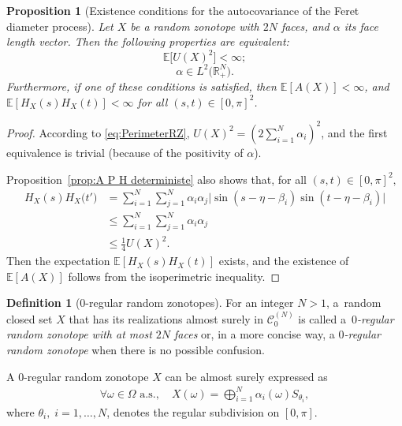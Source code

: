 \documentclass[numbers,compress,v1.0.1]{vmsta}
\newtheorem{proposition}{Proposition}
\theoremstyle{definition}
\newtheorem{definition}{Definition}
\begin{document}
\begin{proposition}[Existence conditions for the autocovariance
of the Feret diameter process]
Let $X$ be a random zonotope with $2N$ faces, and $\alpha$ its face
length vector. Then the following properties are equivalent:
%
\begin{equation}
\mathbb{E}\bigl[U(X)^2\bigr]<\infty;
\end{equation}
%
\begin{equation}
\alpha\in L^2\bigl(\mathbb{R}_+^N\bigr).
\end{equation}
%
Furthermore, if one of these conditions is satisfied, then $\mathbb
{E}[A(X)]<\infty$, and $\mathbb{E}[H_{X}(s)H_{X}(t) ]<\infty$ for all
$(s,t)\in[0,\pi]^2$.
\label{prop:CondExistMoments}
\end{proposition}

\begin{proof}
According to \eqref{eq:PerimeterRZ}, $U(X)^2=(2\sum_{i=1}^N \alpha
_i)^2$, and the first equivalence is trivial (because of the positivity
of $\alpha$).

Proposition~\ref{prop:A P H deterministe} also shows that, for all $
(s,t)\in[0,\pi]^2,\;$
%
\begin{align*}
H_{X}(s) H_{X}\bigl(t'\bigr)&=\sum
_{i=1}^N\sum_{j=1}^N
\alpha_i\alpha_j \bigl\vert\sin (s-\eta-\beta_i )
\sin(t-\eta-\beta_i )\bigr\vert
\\
&\leq\sum_{i=1}^N\sum
_{j=1}^N \alpha_i\alpha_j
\\
&\leq\frac{1}{4}U(X)^2.
\end{align*}
%
Then the expectation $\mathbb{E}[H_{X}(s)H_{X}(t) ]$ exists, and the
existence of $\mathbb{E}[A(X)]$ follows from the isoperimetric inequality.
\end{proof}

\begin{definition}[$0$-regular random zonotopes]
For an integer $N>1$, a~random closed set $X$ that has its realizations
almost surely in $\mathcal{C}^{(N)}_0$ is called a~\textit{$0$-regular
random zonotope with at most $2N$ faces} or, in a more concise way, a
\textit{$0$-regular random zonotope} when there is no possible confusion.
\end{definition}
%
A $0$-regular random zonotope $X$ can be almost surely expressed as
%
\begin{align*}
\forall\omega\in\varOmega\text{ a.s.},\quad X(\omega)=\bigoplus
_{i=1}^{N}\alpha_i(\omega)S_{\theta_i},
\end{align*}
%
where $\theta_i,\; i=1,\dots,N$, denotes the regular subdivision on
$[0,\pi]$.
\end{document}
